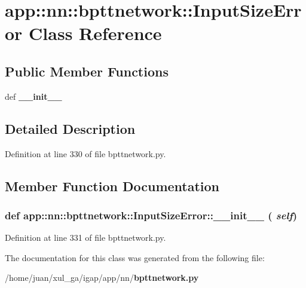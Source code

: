 \section{app::nn::bpttnetwork::InputSizeError Class Reference}
\label{classapp_1_1nn_1_1bpttnetwork_1_1InputSizeError}
\subsection*{Public Member Functions}
\begin{CompactItemize}
\item 
def {\bf \_\-\_\-init\_\-\_\-}
\end{CompactItemize}


\subsection{Detailed Description}


Definition at line 330 of file bpttnetwork.py.

\subsection{Member Function Documentation}
\subsubsection{\setlength{\rightskip}{0pt plus 5cm}def app::nn::bpttnetwork::InputSizeError::\_\-\_\-init\_\-\_\- ( {\em self})}\label{classapp_1_1nn_1_1bpttnetwork_1_1InputSizeError_6dc15c80575c7cb4194f509bfc258d5a}




Definition at line 331 of file bpttnetwork.py.

The documentation for this class was generated from the following file:\begin{CompactItemize}
\item 
/home/juan/xul\_\-ga/igap/app/nn/{\bf bpttnetwork.py}\end{CompactItemize}
